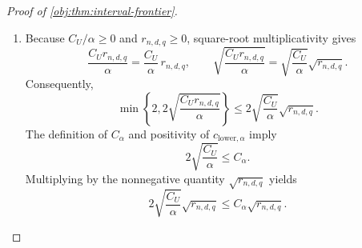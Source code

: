 \begin{proof}[Proof of \cref{obj:thm:interval-frontier}]
\begin{enumerate}
The law class is nonempty. Indeed, the paired construction with all latent masses zero concentrates on its filler label. Write \(P_{\mathrm{fill}}\) for this law, specified by
\[
\begin{gathered}
X=0,\qquad S(0)=S(1)=Y(0)=0,\qquad R=1,\\
A\sim\operatorname{Bernoulli}(1/2),\qquad
Y(1)\sim\operatorname{Bernoulli}\!\left(\frac{(1+q)^2}{8q}\right),
\qquad A\perp Y(1),\\
S=S(A),\qquad Y=Y(A),\qquad RY=R\,Y.
\end{gathered}
\]
The Bernoulli parameter belongs to \([0,1]\), since
\[
0<(1+q)^2\le4\le8q.
\]
This law has one occupied baseline label, independent balanced treatment, consistent realized measurements, and complete arrival. Hence, by \cref{obj:def:law-class},
\[
P_{\mathrm{fill}}\in\mathcal M(d,q).
\]
Taking the supremum of the expected-length bound gives
\[
\sup_{P\in\mathcal M(d,q)}
\mathbb E_{P_O^{\otimes n}}
\left[
\operatorname{length}\{\widehat I_{\mathrm{MM},\alpha}(O^n)\}
\right]
\le
\min\left\{2,2\sqrt{\frac{C_Ur_{n,d,q}}{\alpha}}\right\}.
\]

\item Because \(C_U/\alpha\ge0\) and \(r_{n,d,q}\ge0\), square-root multiplicativity gives
\[
\frac{C_Ur_{n,d,q}}{\alpha}
=\frac{C_U}{\alpha}\,r_{n,d,q},
\qquad
\sqrt{\frac{C_Ur_{n,d,q}}{\alpha}}
=\sqrt{\frac{C_U}{\alpha}}\sqrt{r_{n,d,q}}.
\]
Consequently,
\[
\min\left\{2,2\sqrt{\frac{C_Ur_{n,d,q}}{\alpha}}\right\}
\le
2\sqrt{\frac{C_U}{\alpha}}\sqrt{r_{n,d,q}}.
\]
The definition of \(C_\alpha\) and positivity of \(c_{\mathrm{lower},\alpha}\) imply
\[
2\sqrt{\frac{C_U}{\alpha}}\le C_\alpha.
\]
Multiplying by the nonnegative quantity \(\sqrt{r_{n,d,q}}\) yields
\[
2\sqrt{\frac{C_U}{\alpha}}\sqrt{r_{n,d,q}}
\le C_\alpha\sqrt{r_{n,d,q}}.
\]


\end{enumerate}
\end{proof}
